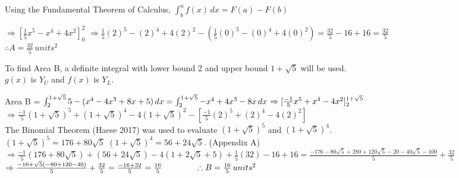 \documentclass{homework}
\begin{document}
\begin{center}
     Using the Fundamental Theorem of Calculus, $\int_b^a f(x) \, dx = F(a)-F(b)$ \\
\end{center}
\begin{flushleft}
    $ \Rightarrow [\frac{1}{5}x^5-x^4+4x^2]_0^2 $ \vspace{0.4em} \linebreak
    $ \Rightarrow \frac{1}{5}(2)^{5}-(2)^{4}+4(2)^{2}-(\frac{1}{5}(0)^{5}-(0)^{4}+4(0)^{2}) = \frac{32}{5}-16+16=\frac{32}{5} $ \vspace{0.4em} \\ 
    $ \therefore A=\frac{32}{5} \, units^2 $ \vspace{1.4em} \\
\end{flushleft}
\begin{center}
    To find Area B, a definite integral with lower bound 2 and upper bound $1+\sqrt{5}$ will be used. \\
    $g(x)$ is $Y_U$ and $f(x)$ is $Y_L$.
\end{center}
\begin{flushleft}
    Area B = $\int_2^{1+\sqrt{5}} 5-(x^4-4x^3+8x+5) \, dx \linebreak
    = \int_2^{1+\sqrt{5}} -x^4+4x^3-8x \, dx \vspace{0.3em}$ \linebreak
    $\Rightarrow [\frac{-1}{5}x^5+x^4-4x^2]_2^{1+\sqrt{5}}\vspace{0.3em}$ \\
    $\Rightarrow  \frac{-1}{5} (1+\sqrt{5})^5+(1+\sqrt{5})^4-4(1+\sqrt{5})^2 - [\frac{-1}{5} (2)^5+(2)^4-4(2)^2] $ \\
    \newpage
    The Binomial Theorem (Haese 2017) was used to evaluate $(1+\sqrt{5})^5$ and $(1+\sqrt{5})^4$. \vspace{0.4em}\\
    $(1+\sqrt{5})^5=176+80\sqrt{5}$ \hspace{4em} $(1+\sqrt{5})^4=56+24\sqrt{5}$. \hspace{4em} (Appendix A)
    \vspace{0.8em}\\
    $\Rightarrow 
    \frac{-1}{5}(176+80\sqrt{5})+(56+24\sqrt{5})-4(1+2\sqrt{5}+5)+\frac{1}{5}(32)-16+16=\frac{-176-80\sqrt{5}+280+120\sqrt{5}-20-40\sqrt{5}-100}{5}+\frac{32}{5}$ \vspace{0.5em} \\
    $ \Rightarrow  \frac{-16+\sqrt{5}(-80+120-40)}{5} + \frac{32}{5} = \frac{-16+32}{5}=\frac{16}{5} \vspace{1.2em} \hspace{4em}
    \therefore B=\frac{16}{5} \, units^2$ \\
\end{flushleft} 
\end{document}
